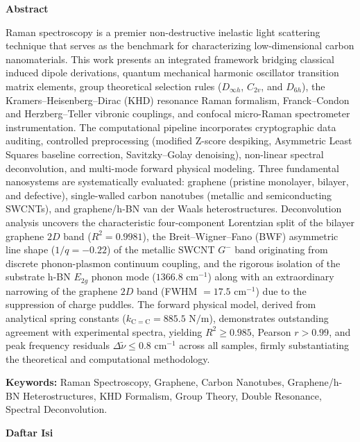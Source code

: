 \documentclass[10pt,a4paper]{article}
\makeatletter
\renewcommand{\contentsname}{Daftar Isi}
\renewcommand\tableofcontents{%
    \clearpage
    \thispagestyle{plain}
    \begin{center}%
        {\Large\bfseries \contentsname\par}%
    \end{center}%
    \vspace{0.8em}%
    \@starttoc{toc}%
    \clearpage
}
\makeatother
\begin{document}
{\begin{center}
    \textbf{Abstract}
\end{center}
\vspace{-0.25cm}
\noindent
Raman spectroscopy is a premier non-destructive inelastic light scattering technique that serves as the benchmark for characterizing low-dimensional carbon nanomaterials. This work presents an integrated framework bridging classical induced dipole derivations, quantum mechanical harmonic oscillator transition matrix elements, group theoretical selection rules ($D_{\infty h}$, $C_{2v}$, and $D_{6h}$), the Kramers--Heisenberg--Dirac (KHD) resonance Raman formalism, Franck--Condon and Herzberg--Teller vibronic couplings, and confocal micro-Raman spectrometer instrumentation. The computational pipeline incorporates cryptographic data auditing, controlled preprocessing (modified Z-score despiking, Asymmetric Least Squares baseline correction, Savitzky--Golay denoising), non-linear spectral deconvolution, and multi-mode forward physical modeling. Three fundamental nanosystems are systematically evaluated: graphene (pristine monolayer, bilayer, and defective), single-walled carbon nanotubes (metallic and semiconducting SWCNTs), and graphene/h-BN van der Waals heterostructures. Deconvolution analysis uncovers the characteristic four-component Lorentzian split of the bilayer graphene $2D$ band ($R^2 = 0.9981$), the Breit--Wigner--Fano (BWF) asymmetric line shape ($1/q = -0.22$) of the metallic SWCNT $G^-$ band originating from discrete phonon-plasmon continuum coupling, and the rigorous isolation of the substrate h-BN $E_{2g}$ phonon mode ($1366.8\text{ cm}^{-1}$) along with an extraordinary narrowing of the graphene $2D$ band (FWHM $= 17.5\text{ cm}^{-1}$) due to the suppression of charge puddles. The forward physical model, derived from analytical spring constants ($k_{\mathrm{C=C}} = 885.5\text{ N/m}$), demonstrates outstanding agreement with experimental spectra, yielding $R^2 \ge 0.985$, Pearson $r > 0.99$, and peak frequency residuals $\Delta\tilde{\nu} \le 0.8\text{ cm}^{-1}$ across all samples, firmly substantiating the theoretical and computational methodology.

\vspace{0.15cm}
\noindent \textbf{Keywords:} Raman Spectroscopy, Graphene, Carbon Nanotubes, Graphene/h-BN Heterostructures, KHD Formalism, Group Theory, Double Resonance, Spectral Deconvolution.
\par}

\clearpage
\tableofcontents
\clearpage









\vspace{0.8cm}
\renewcommand{\refname}{Daftar Pustaka}


\end{document}

